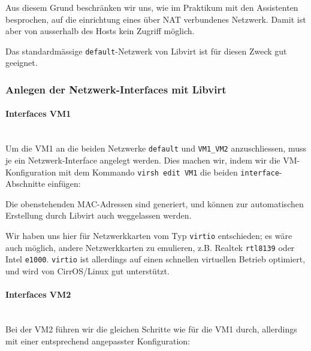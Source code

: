 Aus diesem Grund beschränken wir uns, wie im Praktikum mit den Assistenten besprochen, auf die einrichtung eines über NAT verbundenes Netzwerk. Damit ist aber von ausserhalb des Hosts kein Zugriff möglich.

Das standardmässige \lstinline|default|-Netzwerk von Libvirt ist für diesen Zweck gut geeignet. 



\subsubsection{Anlegen der Netzwerk-Interfaces mit Libvirt}

\paragraph{Interfaces VM1} \hfill \\
Um die VM1 an die beiden Netzwerke \lstinline|default| und \lstinline|VM1_VM2| anzuschliessen, muss je ein Netzwerk-Interface angelegt werden. Dies machen wir, indem wir die VM-Konfiguration mit dem Kommando \lstinline[breaklines=no]|virsh edit VM1| die beiden \lstinline|interface|-Abschnitte einfügen:



Die obenstehenden MAC-Adressen sind generiert, und können zur automatischen Erstellung durch Libvirt auch weggelassen werden.

Wir haben uns hier für Netzwerkkarten vom Typ \lstinline|virtio| entschieden; es wäre auch möglich, andere Netzwerkkarten zu emulieren, z.B. Realtek \lstinline|rtl8139| oder Intel \lstinline|e1000|. \lstinline|virtio| ist allerdings auf einen schnellen virtuellen Betrieb optimiert, und wird von CirrOS/Linux gut unterstützt.

\paragraph{Interfaces VM2} \hfill \\
Bei der VM2 führen wir die gleichen Schritte wie für die VM1 durch, allerdings mit einer entsprechend angepasster Konfiguration:



